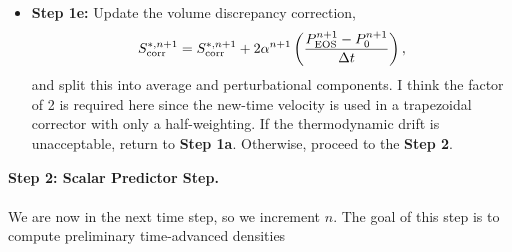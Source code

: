 \documentclass[final]{siamltex}
\def\Fb {{\bf F}}
\def\vb {{\bf v}}
\def\wb {{\bf w}}
\def\Hext {H_{\rm ext}}
\def\half   {\frac{1}{2}}
\begin{document}
\begin{itemize}
\begin{eqnarray}
&&\hspace{-1in} + \half(\rho\Hext)^n + \half(\rho\Hext)^{n+1},
\end{eqnarray}
\begin{eqnarray}
\left(\frac{\rho^{n+1}c_p^{n+1,l}}{\Delta t} - \nabla\cdot\frac{1}{2}\lambda^{n+1,l}\nabla\right)\delta T &=& \frac{(\rho h)^n - \rho^{n+1}h^{n+1,l}}{\Delta t}\nonumber\\
&&\hspace{-1.25in} + \half\left[-\nabla\cdot(\rho h\vb)^n - \nabla\cdot(\rho h\vb)^{*,n+1} + \frac{\bar{S}^n + \bar{S}_{\rm corr}^n}{\bar{\alpha}^n} + \frac{\bar{S}^{*,n+1} + \bar{S}_{\rm corr}^{*,n+1}}{\bar{\alpha}^{*,n+1}}\right]\nonumber\\
&&\hspace{-1.25in} + \half\nabla\cdot\lambda^n\nabla T^n + \half\nabla\cdot\lambda^{n+1,l}\nabla T^{n+1,l}\nonumber\\
&&\hspace{-1.25in} + \half\sum_k\nabla\cdot h_k^n \Fb_k^n + \half\sum_k\nabla\cdot h_k^{n+1,l} \Fb_k^{n+1,l}\nonumber\\
&&\hspace{-1.25in} + \half(\rho\Hext)^n + \half(\rho\Hext)^{n+1}.
\end{eqnarray}
{\bf Step 1d-3:} Update the temperature and enthalpy using
\begin{equation}
T^{n+1,l+1} = T^{n+1,l} + \delta T, \quad h^{n+1,l+1} = h(\wb^{n+1},T^{n+1,l+1}).
\end{equation}
If $l=l_{\rm max}$, set $(h,T)^{n+1} = (h,T)^{n+1,l+1}$ and proceed to {\bf Step 1e}.\\
\item {\bf Step 1e:} Update the volume discrepancy correction,
\begin{equation}
S_{\rm corr}^{*,n+1} = S_{\rm corr}^{*,n+1} + 2\alpha^{n+1}\left(\frac{P_{\rm EOS}^{n+1} - P_0^{n+1}}{\Delta t}\right),
\end{equation}
and split this into average and perturbational components.
I think the factor of 2 is required here since the new-time
velocity is used in a trapezoidal corrector with only a half-weighting.
If the thermodynamic drift is unacceptable, return to {\bf Step 1a}.
Otherwise, proceed to the {\bf Step 2}.\\
\end{itemize}
{\bf Step 2: Scalar Predictor Step.}\\ \\
We are now in the next time step, so we increment $n$.
The goal of this step is to compute preliminary time-advanced densities
\end{document}
